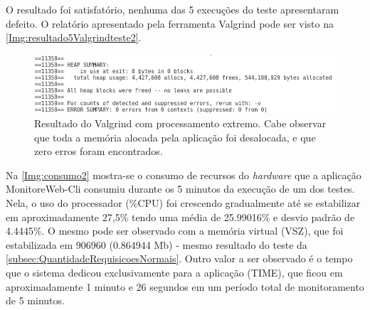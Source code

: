 O resultado foi satisfatório, nenhuma das 5 execuções do teste apresentaram defeito. O relatório apresentado pela ferramenta Valgrind pode ser visto na \autoref{Img:resultado5Valgrindteste2}.

\begin{figure}[H]
	\centering
	\includegraphics[width=1.0\textwidth]{figuras/monitorWebCliTeste2/resultado5 minutos.jpg}
	\caption[Resultado do Valgrind com processamento extremo.]{Resultado do Valgrind com processamento extremo. Cabe observar que toda a memória alocada pela aplicação foi desalocada, e que zero erros foram encontrados.}
	\label{Img:resultado5Valgrindteste2}
\end{figure}


Na \autoref{Img:consumo2} mostra-se o consumo de recursos do \textit{hardware} que a aplicação MonitoreWeb-Cli consumiu durante os 5 minutos da execução de um dos testes. Nela, o uso do processador (\%CPU) foi crescendo gradualmente até se estabilizar em aproximadamente 27,5\% tendo uma média de 25.99016\% e desvio padrão de 4.4445\%. O mesmo pode ser observado com a memória virtual (VSZ), que foi estabilizada em 906960 (0.864944 Mb) - mesmo resultado do teste da \autoref{subsec:QuantidadeRequisicoesNormais}. Outro valor a ser observado é o tempo que o sistema dedicou exclusivamente para a aplicação (TIME), que ficou em aproximadamente 1 minuto e 26 segundos em um período total de monitoramento de 5 minutos.

